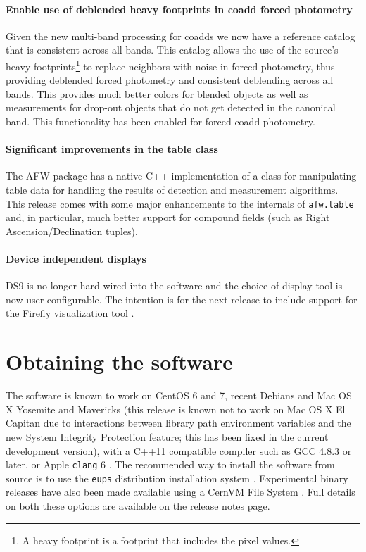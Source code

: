 \documentclass[11pt,twoside]{article}
\begin{document}
\paragraph{Enable use of deblended heavy footprints in coadd forced
  photometry} Given the new multi-band processing for coadds we now
have a reference catalog that is consistent across all bands. This
catalog allows the use of the source's heavy footprints\footnote{A
  heavy footprint is a footprint that includes the pixel values.} to
replace neighbors with noise in forced photometry, thus providing
deblended forced photometry and consistent deblending across all
bands. This provides much better colors for blended objects as well as
measurements for drop-out objects that do not get detected in the
canonical band. This functionality has been enabled for forced coadd
photometry.

\paragraph{Significant improvements in the table class} The AFW package
has a native C++ implementation of a class for manipulating table data
for handling the results of detection and measurement
algorithms. This release comes with some major enhancements to the
internals of \texttt{afw.table} and, in particular, much better
support for compound fields (such as Right Ascension/Declination tuples).

\paragraph{Device independent displays} DS9
\citep[][ascl:0003.002]{2011ASPC..442..633J} is no longer hard-wired into the software
and the choice of display tool is now user configurable.  The
intention is for the next release to include support for the Firefly
visualization tool \citep{O10-1_adassxxv}.

\section{Obtaining the software}

The software is known to work on CentOS 6 and 7, recent Debians and
Mac OS X Yosemite and Mavericks (this release is known not to
  work on Mac OS X El Capitan due to interactions between library path
  environment variables and the new System Integrity Protection
  feature; this has been fixed in the current development version), with a C++11 compatible compiler such as GCC 4.8.3 or later, or
Apple \texttt{clang} 6 . The recommended way to install the software from source is to
use the \texttt{eups} distribution installation system
\citep{EUPS}. Experimental binary releases have also been
made available using a CernVM File
System \citep[CernVM-FS;][]{2015JPhCS.608a2031M}. Full details on both
these options are available on the release notes page.
\end{document}
